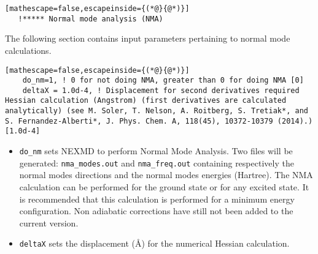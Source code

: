 \begin{lstlisting}[mathescape=false,escapeinside={(*@}{@*)}]
   !***** Normal mode analysis (NMA)
\end{lstlisting}
\noindent The following section contains input parameters pertaining to normal mode calculations.
\begin{lstlisting}[mathescape=false,escapeinside={(*@}{@*)}]
    do_nm=1, ! 0 for not doing NMA, greater than 0 for doing NMA [0]
    deltaX = 1.0d-4, ! Displacement for second derivatives required Hessian calculation (Angstrom) (first derivatives are calculated analytically) (see M. Soler, T. Nelson, A. Roitberg, S. Tretiak*, and S. Fernandez-Alberti*, J. Phys. Chem. A, 118(45), 10372-10379 (2014).)  [1.0d-4]
\end{lstlisting}
\begin{itemize}
    \item \verb+do_nm+ sets NEXMD to perform Normal Mode Analysis. Two files will be generated: \verb+nma_modes.out+ and \verb+nma_freq.out+ containing respectively the normal modes directions and the normal modes energies (Hartree). The NMA calculation can be performed for the ground state or for any excited state. It is recommended that this calculation is performed for a minimum energy configuration. Non adiabatic corrections \cite{soler2014signature} have still not been added to the current version.
    \item \verb+deltaX+ sets the displacement (\AA) for the numerical Hessian calculation.
\end{itemize}

